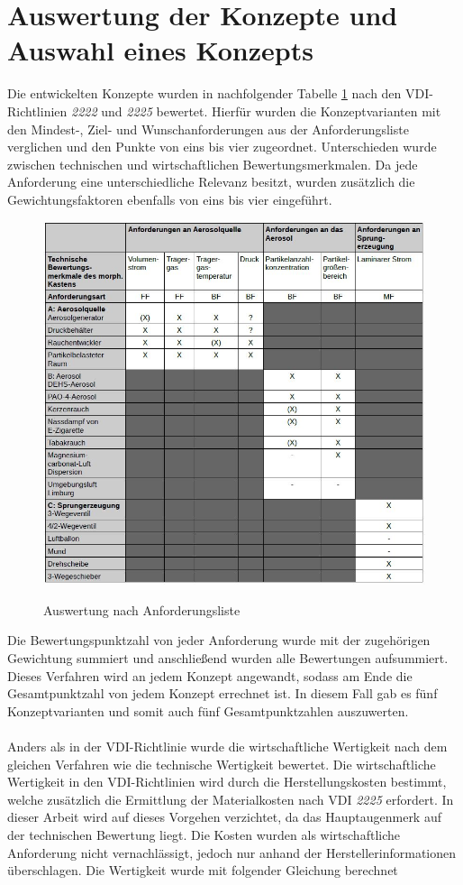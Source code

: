 \section{Auswertung der Konzepte und Auswahl eines Konzepts}
Die entwickelten Konzepte wurden in nachfolgender Tabelle \ref{fig:TabEvalOne} nach den VDI-Richtlinien \textit{2222} und \textit{2225} bewertet. Hierf\"{u}r wurden die Konzeptvarianten mit den Mindest-, Ziel- und Wunschanforderungen aus der Anforderungsliste verglichen und den Punkte von eins bis vier zugeordnet. Unterschieden wurde zwischen technischen und wirtschaftlichen Bewertungsmerkmalen. Da jede Anforderung eine unterschiedliche Relevanz besitzt, wurden zus\"{a}tzlich die Gewichtungsfaktoren ebenfalls von eins bis vier eingef\"{u}hrt.
\begin{figure}[H]
        \myfloatalign
        {\includegraphics[width=.8\linewidth]{gfx/TabEvalOne.jpg}} \quad
        \caption[Auswertung nach Anforderungsliste]
        {Auswertung nach Anforderungsliste}
        \label{fig:TabEvalOne}
\end{figure}
Die Bewertungspunktzahl von jeder Anforderung wurde mit der zugeh\"{o}rigen Gewichtung summiert und anschlie{\ss}end wurden alle Bewertungen aufsummiert. Dieses Verfahren wird an jedem Konzept angewandt, sodass am Ende die Gesamtpunktzahl von jedem Konzept errechnet ist. In diesem Fall gab es f\"{u}nf Konzeptvarianten und somit auch f\"{u}nf Gesamtpunktzahlen auszuwerten.
\\\\
Anders als in der VDI-Richtlinie wurde die wirtschaftliche Wertigkeit nach dem gleichen Verfahren wie die technische Wertigkeit bewertet. Die wirtschaftliche Wertigkeit in den VDI-Richtlinien wird durch die Herstellungskosten bestimmt, welche zus\"{a}tzlich die Ermittlung der Materialkosten nach VDI \textit{2225} erfordert. In dieser Arbeit wird auf dieses Vorgehen verzichtet, da das Hauptaugenmerk auf der technischen Bewertung liegt. Die Kosten wurden als wirtschaftliche Anforderung nicht vernachl\"{a}ssigt, jedoch nur anhand der Herstellerinformationen \"{u}berschlagen. Die Wertigkeit wurde mit folgender Gleichung berechnet
